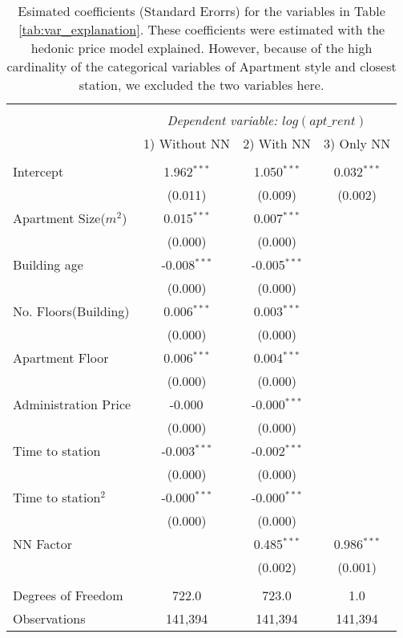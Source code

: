 \begin{table}[!htbp] 
\caption{\label{tab:regression}Esimated coefficients (Standard Erorrs) for the variables in Table \ref{tab:var_explanation}.
These coefficients were estimated with the hedonic price model explained. However, because of the high cardinality 
of the categorical variables of Apartment style and closest station, we excluded the two variables here.%
}
 \centering
\begin{tabular}{@{\extracolsep{5pt}}lccc}
\\[-1.8ex]\hline
\hline \\[-1.8ex]
& \multicolumn{3}{c}{\textit{Dependent variable: \( log(apt\_rent) \)}} \
\cr \cline{3-4}
\\[-1.8ex] & \multicolumn{1}{c}{1) Without NN} & \multicolumn{1}{c}{2) With NN} & \multicolumn{1}{c}{3) Only NN}  \\
\hline \\[-1.8ex]
 Intercept & 1.962$^{***}$ & 1.050$^{***}$ & 0.032$^{***}$ \\
  & (0.011) & (0.009) & (0.002) \\
 Apartment Size(\(m^2\)) & 0.015$^{***}$ & 0.007$^{***}$ & \\
  & (0.000) & (0.000) & \\
 Building age & -0.008$^{***}$ & -0.005$^{***}$ & \\
  & (0.000) & (0.000) & \\
 No. Floors(Building) & 0.006$^{***}$ & 0.003$^{***}$ & \\
  & (0.000) & (0.000) & \\
 Apartment Floor & 0.006$^{***}$ & 0.004$^{***}$ & \\
  & (0.000) & (0.000) & \\
 Administration Price & -0.000$^{}$ & -0.000$^{***}$ & \\
  & (0.000) & (0.000) & \\
 Time to station & -0.003$^{***}$ & -0.002$^{***}$ & \\
  & (0.000) & (0.000) & \\
 Time to station\(^2\) & -0.000$^{***}$ & -0.000$^{***}$ & \\
  & (0.000) & (0.000) & \\
 NN Factor & & 0.485$^{***}$ & 0.986$^{***}$ \\
  & & (0.002) & (0.001) \\
\hline \\[-1.8ex]
 Degrees of Freedom & 722.0 & 723.0 & 1.0 \\
 Observations & 141,394 & 141,394 & 141,394 \\

\end{tabular}
\end{table}
